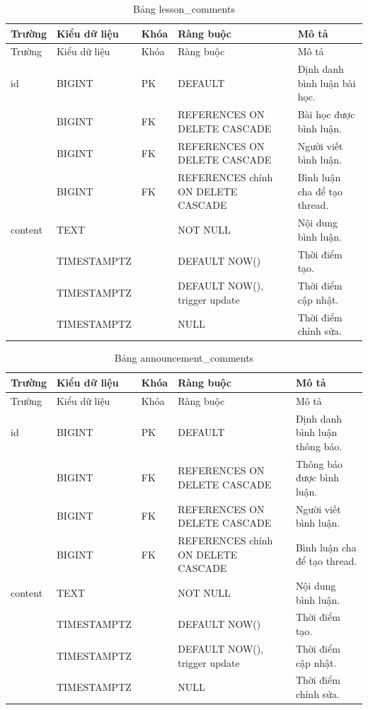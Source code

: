 \documentclass[12pt,a4paper]{report}
\begin{document}
\begin{longtable}{L{2.35cm} L{2.1cm} L{1.15cm} L{3.25cm} L{4.85cm}}
\caption{Bảng lesson\_comments}\label{tab:db-lesson-comments}\\
\toprule
Trường & Kiểu dữ liệu & Khóa & Ràng buộc & Mô tả \\
\midrule
\endfirsthead\toprule Trường & Kiểu dữ liệu & Khóa & Ràng buộc & Mô tả \\\midrule\endhead
id & BIGINT & PK & DEFAULT  & Định danh bình luận bài học. \\
 & BIGINT & FK & REFERENCES  ON DELETE CASCADE & Bài học được bình luận. \\
 & BIGINT & FK & REFERENCES  ON DELETE CASCADE & Người viết bình luận. \\
 & BIGINT & FK & REFERENCES chính  ON DELETE CASCADE & Bình luận cha để tạo thread. \\
content & TEXT & & NOT NULL & Nội dung bình luận. \\
 & TIMESTAMPTZ & & DEFAULT NOW() & Thời điểm tạo. \\
 & TIMESTAMPTZ & & DEFAULT NOW(), trigger update & Thời điểm cập nhật. \\
 & TIMESTAMPTZ & & NULL & Thời điểm chỉnh sửa. \\

\bottomrule
\end{longtable}

\begin{longtable}{L{2.35cm} L{2.1cm} L{1.15cm} L{3.25cm} L{4.85cm}}
\caption{Bảng announcement\_comments}\label{tab:db-announcement-comments}\\
\toprule
Trường & Kiểu dữ liệu & Khóa & Ràng buộc & Mô tả \\
\midrule
\endfirsthead\toprule Trường & Kiểu dữ liệu & Khóa & Ràng buộc & Mô tả \\\midrule\endhead
id & BIGINT & PK & DEFAULT  & Định danh bình luận thông báo. \\
 & BIGINT & FK & REFERENCES  ON DELETE CASCADE & Thông báo được bình luận. \\
 & BIGINT & FK & REFERENCES  ON DELETE CASCADE & Người viết bình luận. \\
 & BIGINT & FK & REFERENCES chính  ON DELETE CASCADE & Bình luận cha để tạo thread. \\
content & TEXT & & NOT NULL & Nội dung bình luận. \\
 & TIMESTAMPTZ & & DEFAULT NOW() & Thời điểm tạo. \\
 & TIMESTAMPTZ & & DEFAULT NOW(), trigger update & Thời điểm cập nhật. \\
 & TIMESTAMPTZ & & NULL & Thời điểm chỉnh sửa. \\

\bottomrule
\end{longtable}
\endgroup
\end{document}
